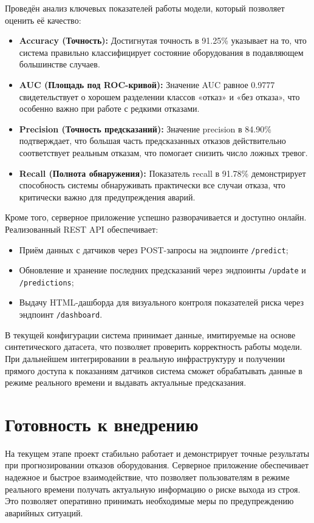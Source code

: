 \documentclass[a4paper,12pt]{article}
\begin{document}
\begin{flushleft}
Проведён анализ ключевых показателей работы модели, который позволяет оценить её качество:
\begin{itemize}
    \item \textbf{Accuracy (Точность):} Достигнутая точность в 91.25\% указывает на то, что система правильно классифицирует состояние оборудования в подавляющем большинстве случаев.
    \item \textbf{AUC (Площадь под ROC-кривой):} Значение AUC равное 0.9777 свидетельствует о хорошем разделении классов «отказ» и «без отказа», что особенно важно при работе с редкими отказами.
    \item \textbf{Precision (Точность предсказаний):} Значение precision в 84.90\% подтверждает, что большая часть предсказанных отказов действительно соответствует реальным отказам, что помогает снизить число ложных тревог.
    \item \textbf{Recall (Полнота обнаружения):} Показатель recall в 91.78\% демонстрирует способность системы обнаруживать практически все случаи отказа, что критически важно для предупреждения аварий.
\end{itemize}

Кроме того, серверное приложение успешно разворачивается и доступно онлайн. Реализованный REST API обеспечивает:
\begin{itemize}
    \item Приём данных с датчиков через POST-запросы на эндпоинте \texttt{/predict};
    \item Обновление и хранение последних предсказаний через эндпоинты \texttt{/update} и \texttt{/predictions};
    \item Выдачу HTML-дашборда для визуального контроля показателей риска через эндпоинт \texttt{/dashboard}.
\end{itemize}

В текущей конфигурации система принимает данные, имитируемые на основе синтетического датасета, что позволяет проверить корректность работы модели. При дальнейшем интегрировании в реальную инфраструктуру и получении прямого доступа к показаниям датчиков система сможет обрабатывать данные в режиме реального времени и выдавать актуальные предсказания.




\section{Готовность к внедрению}

На текущем этапе проект стабильно работает и демонстрирует точные результаты при прогнозировании отказов оборудования.
Серверное приложение обеспечивает надежное и быстрое взаимодействие, что позволяет пользователям в режиме реального
времени получать актуальную информацию о риске выхода из строя. Это позволяет оперативно принимать необходимые меры по
предупреждению аварийных ситуаций.


\end{flushleft}
\end{document}
